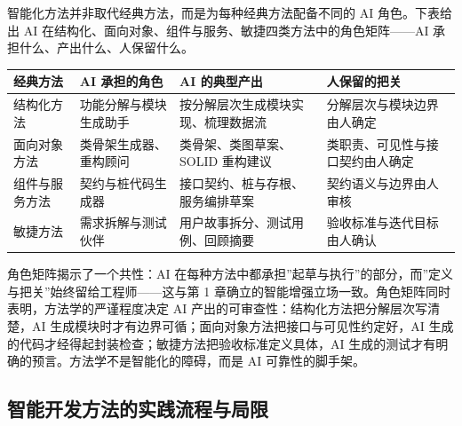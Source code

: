\documentclass[
]{ctexbook}
\newcounter{none}
\begin{document}
智能化方法并非取代经典方法，而是为每种经典方法配备不同的 AI
角色。下表给出 AI
在结构化、面向对象、组件与服务、敏捷四类方法中的角色矩阵------AI
承担什么、产出什么、人保留什么。

{\def\LTcaptype{none} %
\begin{longtable}[]{@{}
  >{\raggedright\arraybackslash}p{}
  >{\raggedright\arraybackslash}p{}
  >{\raggedright\arraybackslash}p{}
  >{\raggedright\arraybackslash}p{}@{}}
\toprule\noalign{}
\begin{minipage}[b]{\linewidth}\raggedright
经典方法
\end{minipage} & \begin{minipage}[b]{\linewidth}\raggedright
AI 承担的角色
\end{minipage} & \begin{minipage}[b]{\linewidth}\raggedright
AI 的典型产出
\end{minipage} & \begin{minipage}[b]{\linewidth}\raggedright
人保留的把关
\end{minipage} \\
\midrule\noalign{}
\endhead
\bottomrule\noalign{}
\endlastfoot
结构化方法 & 功能分解与模块生成助手 & 按分解层次生成模块实现、梳理数据流
& 分解层次与模块边界由人确定 \\
面向对象方法 & 类骨架生成器、重构顾问 & 类骨架、类图草案、SOLID 重构建议
& 类职责、可见性与接口契约由人确定 \\
组件与服务方法 & 契约与桩代码生成器 & 接口契约、桩与存根、服务编排草案 &
契约语义与边界由人审核 \\
敏捷方法 & 需求拆解与测试伙伴 & 用户故事拆分、测试用例、回顾摘要 &
验收标准与迭代目标由人确认 \\
\end{longtable}
}

角色矩阵揭示了一个共性：AI
在每种方法中都承担''起草与执行''的部分，而''定义与把关''始终留给工程师------这与第
1 章确立的智能增强立场一致。角色矩阵同时表明，方法学的严谨程度决定 AI
产出的可审查性：结构化方法把分解层次写清楚，AI
生成模块时才有边界可循；面向对象方法把接口与可见性约定好，AI
生成的代码才经得起封装检查；敏捷方法把验收标准定义具体，AI
生成的测试才有明确的预言。方法学不是智能化的障碍，而是 AI
可靠性的脚手架。

\subsection{智能开发方法的实践流程与局限}\label{ux667aux80fdux5f00ux53d1ux65b9ux6cd5ux7684ux5b9eux8df5ux6d41ux7a0bux4e0eux5c40ux9650}
\end{document}
